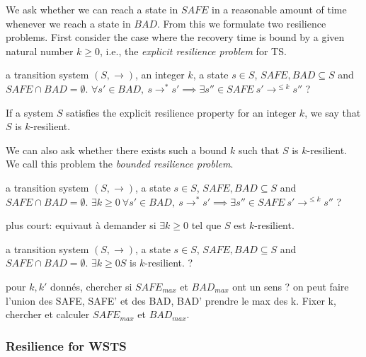 We ask whether we can reach a state 
in 
%
$SAFE$  in a reasonable amount of time whenever we reach a state 
in
%
$BAD$. 
From this we formulate two resilience problems. First consider the case where the recovery time
is bound by a given natural number $k \geq 0$, i.e., the \emph{explicit resilience problem} for TS.

{a transition system $(S,\rightarrow)$, an integer $k$, a state $s \in S$, $SAFE, BAD \subseteq S$ and $SAFE \cap BAD = \emptyset$.}
{$\forall s' \in BAD, ~ s \rightarrow^* s' \implies \exists s'' \in SAFE ~ s' \rightarrow^{\leq k} s''$ ?\newline}

If a system $S$ satisfies the explicit resilience property for an integer $k$, we say that $S$ is $k$-resilient.


We can also ask whether there exists such a bound $k$ such that $S$ is $k$-resilient. We call this problem the \emph{bounded resilience problem}.


{a transition system $(S,\rightarrow)$, a state $s \in S$, $SAFE, BAD \subseteq S$ and $SAFE \cap BAD = \emptyset$.}
{$\exists k \geq 0 ~ \forall s' \in BAD, ~ s \rightarrow^* s' \implies \exists s'' \in SAFE ~ s' \rightarrow^{\leq k} s''$ ?\newline}

 plus court: equivaut à demander si $\exists k \geq 0$ tel que $S$ est $k$-resilient.


{a transition system $(S,\rightarrow)$, a state $s \in S$, $SAFE, BAD \subseteq S$ and $SAFE \cap BAD = \emptyset$.}
{$\exists k \geq 0  S$ is $k$-resilient. ?\newline}

pour $k,k'$ donnés, chercher si $SAFE_{max}$ et $BAD_{max}$ ont un sens ? on peut faire l'union des SAFE, SAFE' et des BAD, BAD' prendre le max des k. Fixer k, chercher et calculer $SAFE_{max}$ et $BAD_{max}$.


\subsubsection{Resilience for WSTS}


